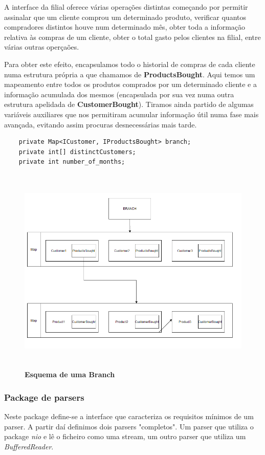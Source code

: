 \documentclass[11pt]{article}
\begin{document}
A interface da filial oferece várias operações distintas começando por permitir assinalar que um cliente comprou um determinado produto, verificar quantos compradores distintos houve num determinado mês, obter toda a informação relativa às compras de um cliente, obter o total gasto pelos clientes na filial, entre várias outras operçaões.

Para obter este efeito, encapsulamos todo o historial de compras de cada cliente numa estrutura própria a que chamamos de \textbf{ProductsBought}. Aqui temos um mapeamento entre todos os produtos comprados por um determinado cliente e a informação acumulada dos mesmos (encapsulada por sua vez numa outra estrutura apelidada de \textbf{CustomerBought}). Tiramos ainda partido de algumas variáveis auxiliares que nos permitiram acumular informação útil numa fase mais avançada, evitando assim procuras desnecessárias mais tarde.

\begin{verbatim}
    private Map<ICustomer, IProductsBought> branch;
    private int[] distinctCustomers;
    private int number_of_months; 
\end{verbatim}

\vspace{1cm}
\begin{figure}[H]
    \centering
    \includegraphics[width=\textwidth,height=10cm]{images/esquema_branch.png}
    \caption{\textbf{Esquema de uma Branch}}
\end{figure}
\subsubsection{Package de parsers}
Neste package define-se a interface que caracteriza os requisitos mínimos de um parser. A partir daí definimos dois parsers "completos". Um parser que utiliza o package \textit{nio} e lê o ficheiro como uma stream, um outro parser que utiliza um \textit{BufferedReader}.
\end{document}
